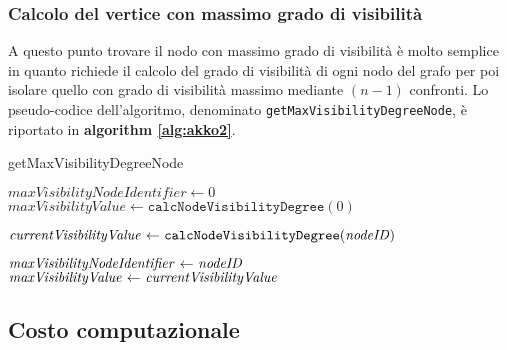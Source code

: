 \documentclass[10pt,a4paper,titlepage]{article}
\begin{document}
\subsubsection{Calcolo del vertice con massimo grado di visibilità}

A questo punto trovare il nodo con massimo grado di visibilità è molto semplice in quanto richiede il calcolo del grado di visibilità di ogni nodo del grafo per poi isolare quello con grado di visibilità massimo mediante $(n-1)$ confronti. Lo pseudo-codice dell'algoritmo, denominato \texttt{getMaxVisibilityDegreeNode}, è riportato in \textbf{algorithm \ref{alg:akko2}}.

\begin{center}
\begin{algorithm}
\caption{getMaxVisibilityDegreeNode}\label{alg:akko2}
\begin{algorithmic}[1]

\State $\textit{maxVisibilityNodeIdentifier} \gets 0$
\State $\textit{maxVisibilityValue} \gets \texttt{calcNodeVisibilityDegree}(0)$

			
			\State $\text{\textit{currentVisibilityValue} $\gets$ \texttt{calcNodeVisibilityDegree}(\textit{nodeID})}$
			
				
				\State $\text{\textit{maxVisibilityNodeIdentifier} $\gets$ \textit{nodeID}}$
				\State $\text{\textit{maxVisibilityValue} $\gets$ \textit{currentVisibilityValue}}$
				
        		\EndIf
		
		\EndFor	
\EndFunction
\end{algorithmic}
\end{algorithm}
\end{center}

\newpage

\subsection{Costo computazionale}
\end{document}
